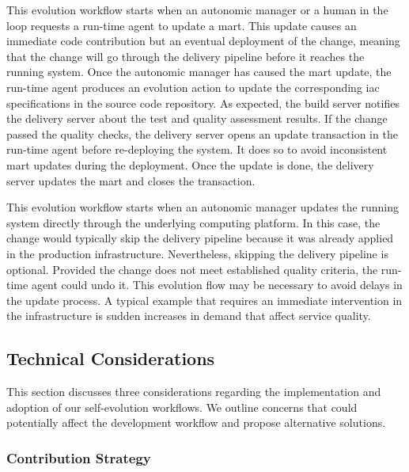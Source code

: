 \begin{description}[style=unboxed,leftmargin=0cm,font=\bfseries\normalsize]
	\item[CI-aware Evolution] This evolution workflow starts when an autonomic manager or a human in the loop requests a run-time agent to update a \gls{mart}. This update causes an immediate code contribution but an eventual deployment of the change, meaning that the  change will go through the delivery pipeline before it reaches the running system. Once the autonomic manager has caused the \gls{mart} update, the run-time agent produces an evolution action to update the corresponding \gls{iac} specifications in the source code repository. As expected, the build server notifies the delivery server about the test and quality assessment results. If the change passed the quality checks, the delivery server opens an update transaction in the run-time agent before re-deploying the system. It does so to avoid inconsistent \gls{mart} updates during the deployment. Once the update is done, the delivery server updates the \gls{mart} and closes the transaction.

	\item[Direct Evolution] This evolution workflow starts when an autonomic manager updates the running system directly through the underlying computing platform. In this case, the change would typically skip the delivery pipeline because it was already applied in the production infrastructure. Nevertheless, skipping the delivery pipeline is optional. Provided the change does not meet established quality criteria, the run-time agent could undo it. This evolution flow may be necessary to avoid delays in the update process. A typical example that requires an immediate intervention in the infrastructure is sudden increases in demand that affect service quality.
\end{description}

\subsection{Technical Considerations}

This section discusses three considerations regarding the implementation and adoption of our self-evolution workflows. We outline concerns that could potentially affect the development workflow and propose alternative solutions.


\subsubsection{Contribution Strategy}

